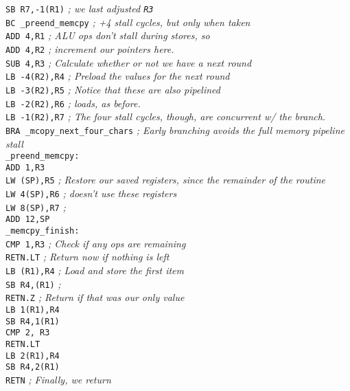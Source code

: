 \documentclass{gqtekspec}
\begin{document}
\begin{table}
\begin{center}
{{\begin{tabbing}
\>	{\tt SB  R7,-1(R1)}	\> {\em ; we last adjusted {\tt R3}}\\
\>	{\tt BC  \_preend\_memcpy} \> {\em ; +4 stall cycles, but only when taken}\\
\>	{\tt ADD  4,R1}	\> {\em ; ALU ops don't stall during stores, so}\\
\>	{\tt ADD  4,R2}	\> {\em ; increment our pointers here.} \\
\>	{\tt SUB  4,R3} \> {\em ; Calculate whether or not we have a next round}\\
\>	{\tt LB  -4(R2),R4} \>	{\em ; Preload the values for the next round}\\
\>	{\tt LB  -3(R2),R5}\>	{\em ; Notice that these are also pipelined}\\
\>	{\tt LB  -2(R2),R6}\>	{\em ; loads, as before.}\\
\>	{\tt LB  -1(R2),R7}\>  {\em ; The four stall cycles, though, are concurrent w/ the branch.}\\
\>	{\tt BRA  \_mcopy\_next\_four\_chars}\hspace{0.25in} {\em ; Early branching avoids the full memory pipeline stall} \\
{\tt \_preend\_memcpy:}\\
\>	{\tt ADD  1,R3}	\\
\>	{\tt LW (SP),R5}  \> {\em ; Restore our saved registers, since the remainder of the routine}\\
\>	{\tt LW 4(SP),R6} \> {\em ; doesn't use these registers}\\
\>	{\tt LW 8(SP),R7} \> {\em ;}\\
\>	{\tt ADD 12,SP}	\\
{\tt \_memcpy\_finish:}\>\\
\>	{\tt CMP 1,R3} \> {\em ; Check if any ops are remaining }\\
\>	{\tt RETN.LT} \> {\em ; Return now if nothing is left}\\
\>	{\tt LB (R1),R4} \> {\em ; Load and store the first item}\\
\>	{\tt SB R4,(R1)} \> {\em ;}\\
\>	{\tt RETN.Z}	\> {\em ; Return if that was our only value}\\
\>	{\tt LB 1(R1),R4} \\
\>	{\tt SB R4,1(R1)}\\
\>	{\tt CMP 2, R3}\\
\>	{\tt RETN.LT}\\
\>	{\tt LB 2(R1),R4} \\
\>	{\tt SB R4,2(R1)}\\
\>	{\tt RETN} \> {\em ; Finally, we return}\\
\end{tabbing}}%
}
\caption{Example Memory Copy code in Zip Assembly, Hand Optimized}\label{tbl:memcp-opt}
\end{center}\end{table}
\end{document}
